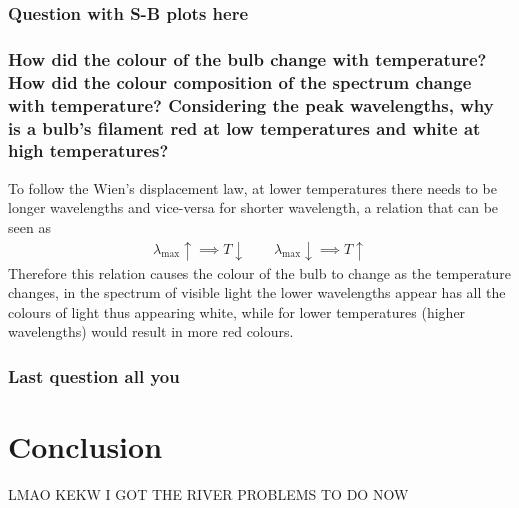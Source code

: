\documentclass{article}
\begin{document}
\subsubsection*{Question with S-B plots here}

\newpage
\subsubsection*{How did the colour of the bulb change with temperature? How did
the colour composition of the spectrum change with temperature? Considering the
peak wavelengths, why is a bulb's filament red at low temperatures and white at
high temperatures?}
To follow the Wien's displacement law, at lower temperatures there needs to be
longer wavelengths and vice-versa for shorter wavelength, a relation that can be
seen as 
\begin{align*}
    \lambda_{\max}\uparrow \implies T\downarrow \ \ \ \ \ \ \ \ \ 
    \lambda_{\max}\downarrow \implies T\uparrow
\end{align*}
Therefore this relation causes the colour of the bulb to change as the temperature
changes, in the spectrum of visible light the lower wavelengths appear has
all the colours of light thus appearing white, while for lower temperatures 
(higher wavelengths) would result in more red colours.

\subsubsection*{Last question all you}


\section{Conclusion}
LMAO KEKW I GOT THE RIVER PROBLEMS TO DO NOW
\end{document}
